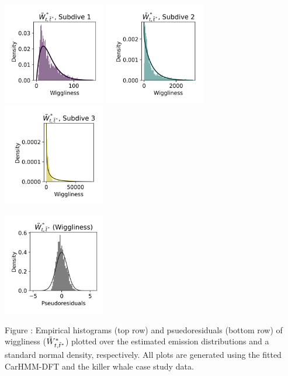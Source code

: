 \documentclass{article}
\begin{document}
        \begin{center}
        \includegraphics[width=1.75in]{../Plots/2019/20190902-182840-CATs_OB_1_0_267_CarHMM_empirical_hist_ahat_0.png}
        \includegraphics[width=1.75in]{../Plots/2019/20190902-182840-CATs_OB_1_0_267_CarHMM_empirical_hist_ahat_1.png}
        \includegraphics[width=1.75in]{../Plots/2019/20190902-182840-CATs_OB_1_0_267_CarHMM_empirical_hist_ahat_2.png}
        
        \includegraphics[width=1.75in]{../Plots/2019/20190902-182840-CATs_OB_1_0_267_CarHMM_pseudresids_ahat.png}
        \end{center}
        
        \noindent Figure : Empirical histograms (top row) and psuedoresiduals (bottom row) of wiggliness ($\tilde{W}^*_{t,\tilde t^*}$) plotted over the estimated emission distributions and a standard normal density, respectively. All plots are generated using the fitted CarHMM-DFT and the killer whale case study data.
        \addtocounter{fignum}{1}
        
\end{document}

